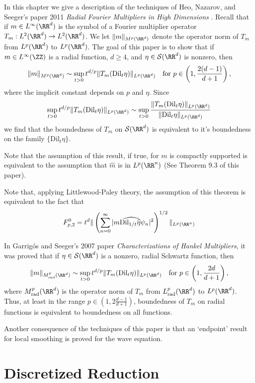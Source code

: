 In this chapter we give a description of the techniques of Heo, Nazarov, and Seeger's paper 2011 \emph{Radial Fourier Multipliers in High Dimensions} \cite{HeoNazrovSeeger2011}. Recall that if $m \in L^\infty(\RR^d)$ is the symbol of a Fourier multiplier operator $T_m: L^2(\RR^d) \to L^2(\RR^d)$. We let $\| m \|_{M^p(\RR^d)}$ denote the operator norm of $T_m$ from $L^p(\RR^d)$ to $L^p(\RR^d)$. The goal of this paper is to show that if $m \in L^\infty(\ZZ)$ is a radial function, $d \geq 4$, and $\eta \in \mathcal{S}(\RR^d)$ is nonzero, then
%
\[ \| m \|_{M^p(\RR^d)} \sim \sup_{t > 0} t^{d/p} \| T_m(\text{Dil}_t \eta) \|_{L^p(\RR^d)} \quad \text{for}\ p \in \left(1, \frac{2(d-1)}{d+1} \right), \]
%
where the implicit constant depends on $p$ and $\eta$. Since
%
\[ \sup_{t > 0} t^{d/p} \| T_m(\text{Dil}_t \eta) \|_{L^p(\RR^d)} \sim \sup_{t > 0} \frac{\| T_m(\text{Dil}_t \eta) \|_{L^p(\RR^d)}}{\| \text{Dil}_t \eta \|_{L^p(\RR^d)}} \]
%
we find that the boundedness of $T_m$ on $\mathcal{S}(\RR^d)$ is equivalent to it's boundedness on the family $\{ \text{Dil}_t \eta \}$.

Note that the assumption of this result, if true, for $m$ is compactly supported is equivalent to the assumption that $\widehat{m}$ is in $L^p(\RR^n)$ (See Theorem 9.3 of this paper).

Note that, applying Littlewood-Paley theory, the assumption of this theorem is equivalent to the fact that
%
\[ F_{p,2}^0 = t^d \| \left( \sum_{n = 0}^\infty |\widehat{m \text{Dil}_{1/t} \widehat{\eta} \psi_n}|^2 \right)^{1/2} \|_{L^p(\RR^n)} \]

In Garrig\'{o}s and Seeger's 2007 paper \emph{Characterizations of Hankel Multipliers}, it was proved that if $\eta \in \mathcal{S}(\RR^d)$ is a nonzero, radial Schwartz function, then
%
\[ \| m \|_{M^p_{\text{rad}}(\RR^d)} \sim \sup_{t > 0} t^{d/p}  \| T_m(\text{Dil}_t \eta) \|_{L^p(\RR^d)}\quad\text{for}\ p \in \left( 1, \frac{2d}{d+1} \right), \]
%
where $M^p_{\text{rad}}(\RR^d)$ is the operator norm of $T_m$ from $L^p_{\text{rad}}(\RR^d)$ to $L^p(\RR^d)$. Thus, at least in the range $p \in \left( 1, 2\frac{d-1}{d+1} \right)$, boundedness of $T_m$ on radial functions is equivalent to boundedness on all functions.

Another consequence of the techniques of this paper is that an `endpoint' result for local smoothing is proved for the wave equation.

\section{Discretized Reduction}


